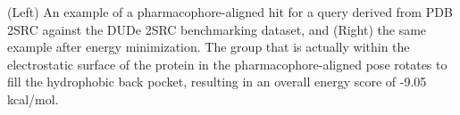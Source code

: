 \label{minfig} (Left) An example of a pharmacophore-aligned hit for a query derived from PDB 2SRC against the DUDe 2SRC benchmarking dataset, and (Right) the same example after energy minimization. The group that is actually within the electrostatic surface of the protein in the pharmacophore-aligned pose rotates to fill the hydrophobic back pocket, resulting in an overall energy score of -9.05 kcal/mol.